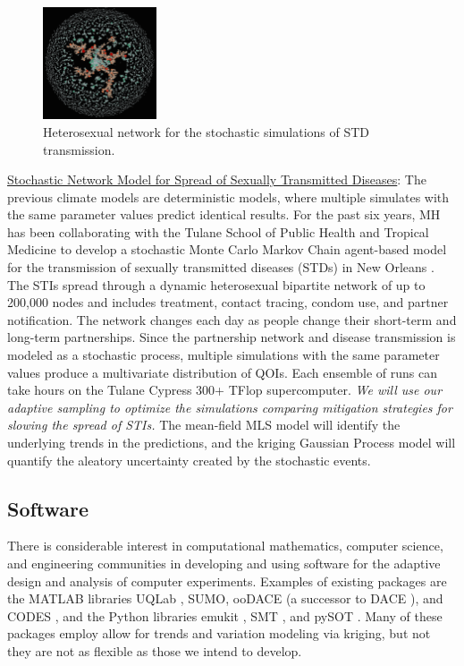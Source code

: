 \documentclass[11pt]{NSFamsart}
\newcommand{\Upara}[1]{\noindent\underline{\upshape #1}:}
\begin{document}
\begin{figure}
\begin{center}
\includegraphics[width = 0.3\textwidth]{ProgramsImages/sexualNetworkNOLA}
\end{center}
\caption{Heterosexual network for the stochastic simulations of STD transmission.}
\label{netmodel}
\end{figure}\Upara{Stochastic Network Model for Spread of Sexually Transmitted Diseases} The previous climate models are deterministic models, where multiple simulates with the same parameter values predict identical results. 
For the past six years, MH has been collaborating with the Tulane School of 
Public Health and Tropical Medicine to develop a stochastic Monte Carlo Markov Chain agent-based model for the transmission of sexually transmitted diseases (STDs) in New Orleans \cite{azizi2016multi,azizi2018using,chowell2016mathematical}. 
The STIs spread through a dynamic heterosexual bipartite network of up to 200,000 nodes and includes treatment, contact tracing, condom use, and partner notification. The network changes each day as people change their short-term and long-term partnerships. 
Since the partnership network and disease transmission is modeled as a stochastic process, multiple simulations with the same parameter values produce a multivariate distribution of QOIs. Each ensemble of runs can take hours on the Tulane Cypress 300+ TFlop supercomputer. 
\emph{We will use our adaptive sampling to optimize the simulations comparing mitigation strategies for slowing the spread of STIs.} 
The mean-field MLS model will identify the underlying trends in the predictions, and the kriging Gaussian Process model will quantify the aleatory uncertainty created by the stochastic events.


\subsection{Software} \label{sec:Software}
There is considerable interest in computational mathematics, computer science, and engineering communities in developing and using software for the adaptive design and analysis of computer experiments. Examples of existing packages are the MATLAB libraries UQLab \cite{UQLab2014}, SUMO\cite{SUMO2010}, ooDACE \cite{ooDACE2014} (a successor to DACE \cite{dace2002}), and CODES \cite{CODES2015}, and the Python libraries emukit \cite{emukit2019}, SMT \cite{SMT2019}, and pySOT \cite{pySOT2015}. Many of these packages employ allow for trends and variation modeling via kriging, but not they are not as flexible as those we intend to develop.
\end{document}
